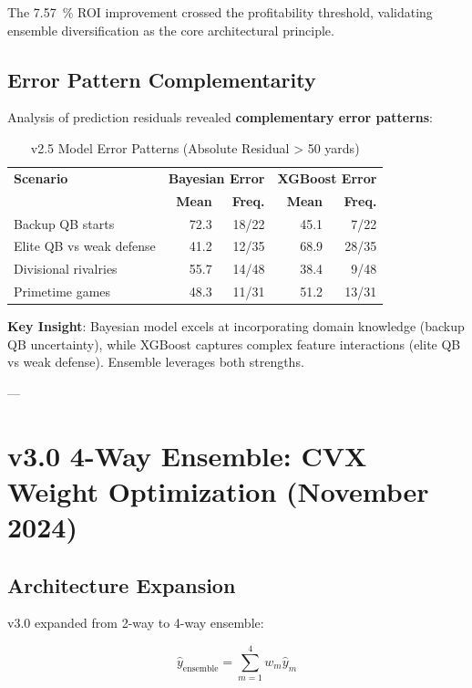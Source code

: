 The \SI{7.57}{\percent} ROI improvement crossed the profitability threshold, validating ensemble diversification as the core architectural principle.

\subsection{Error Pattern Complementarity}

Analysis of prediction residuals revealed \textbf{complementary error patterns}:

\begin{table}[h]
\centering
\caption{v2.5 Model Error Patterns (Absolute Residual > 50 yards)}
\label{tab:v2-5-error-patterns}
\begin{tabular}{lrrrr}
\toprule
\textbf{Scenario} & \multicolumn{2}{c}{\textbf{Bayesian Error}} & \multicolumn{2}{c}{\textbf{XGBoost Error}} \\
                  & \textbf{Mean} & \textbf{Freq.} & \textbf{Mean} & \textbf{Freq.} \\
\midrule
Backup QB starts & 72.3 & 18/22 & 45.1 & 7/22 \\
Elite QB vs weak defense & 41.2 & 12/35 & 68.9 & 28/35 \\
Divisional rivalries & 55.7 & 14/48 & 38.4 & 9/48 \\
Primetime games & 48.3 & 11/31 & 51.2 & 13/31 \\
\bottomrule
\end{tabular}
\end{table}

\textbf{Key Insight}: Bayesian model excels at incorporating domain knowledge (backup QB uncertainty), while XGBoost captures complex feature interactions (elite QB vs weak defense). Ensemble leverages both strengths.

---

\section{v3.0 4-Way Ensemble: CVX Weight Optimization (November 2024)}

\subsection{Architecture Expansion}

v3.0 expanded from 2-way to 4-way ensemble:

\begin{equation}
\hat{y}_{\text{ensemble}} = \sum_{m=1}^{4} w_m \hat{y}_m
\label{eq:v3-ensemble}
\end{equation}

